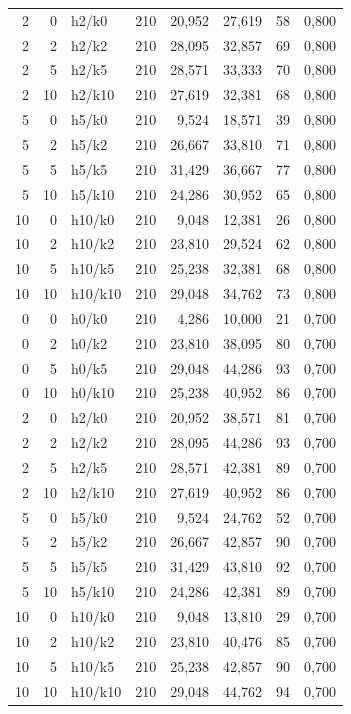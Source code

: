 \begin{longtable}{rrlrrrrr}
2 & 0 & h2/k0 & 210 & 20,952 & 27,619 & 58 & 0,800 \\
2 & 2 & h2/k2 & 210 & 28,095 & 32,857 & 69 & 0,800 \\
2 & 5 & h2/k5 & 210 & 28,571 & 33,333 & 70 & 0,800 \\
2 & 10 & h2/k10 & 210 & 27,619 & 32,381 & 68 & 0,800 \\
5 & 0 & h5/k0 & 210 & 9,524 & 18,571 & 39 & 0,800 \\
5 & 2 & h5/k2 & 210 & 26,667 & 33,810 & 71 & 0,800 \\
5 & 5 & h5/k5 & 210 & 31,429 & 36,667 & 77 & 0,800 \\
5 & 10 & h5/k10 & 210 & 24,286 & 30,952 & 65 & 0,800 \\
10 & 0 & h10/k0 & 210 & 9,048 & 12,381 & 26 & 0,800 \\
10 & 2 & h10/k2 & 210 & 23,810 & 29,524 & 62 & 0,800 \\
10 & 5 & h10/k5 & 210 & 25,238 & 32,381 & 68 & 0,800 \\
10 & 10 & h10/k10 & 210 & 29,048 & 34,762 & 73 & 0,800 \\
0 & 0 & h0/k0 & 210 & 4,286 & 10,000 & 21 & 0,700 \\
0 & 2 & h0/k2 & 210 & 23,810 & 38,095 & 80 & 0,700 \\
0 & 5 & h0/k5 & 210 & 29,048 & 44,286 & 93 & 0,700 \\
0 & 10 & h0/k10 & 210 & 25,238 & 40,952 & 86 & 0,700 \\
2 & 0 & h2/k0 & 210 & 20,952 & 38,571 & 81 & 0,700 \\
2 & 2 & h2/k2 & 210 & 28,095 & 44,286 & 93 & 0,700 \\
2 & 5 & h2/k5 & 210 & 28,571 & 42,381 & 89 & 0,700 \\
2 & 10 & h2/k10 & 210 & 27,619 & 40,952 & 86 & 0,700 \\
5 & 0 & h5/k0 & 210 & 9,524 & 24,762 & 52 & 0,700 \\
5 & 2 & h5/k2 & 210 & 26,667 & 42,857 & 90 & 0,700 \\
5 & 5 & h5/k5 & 210 & 31,429 & 43,810 & 92 & 0,700 \\
5 & 10 & h5/k10 & 210 & 24,286 & 42,381 & 89 & 0,700 \\
10 & 0 & h10/k0 & 210 & 9,048 & 13,810 & 29 & 0,700 \\
10 & 2 & h10/k2 & 210 & 23,810 & 40,476 & 85 & 0,700 \\
10 & 5 & h10/k5 & 210 & 25,238 & 42,857 & 90 & 0,700 \\
10 & 10 & h10/k10 & 210 & 29,048 & 44,762 & 94 & 0,700 \\
\end{longtable}
